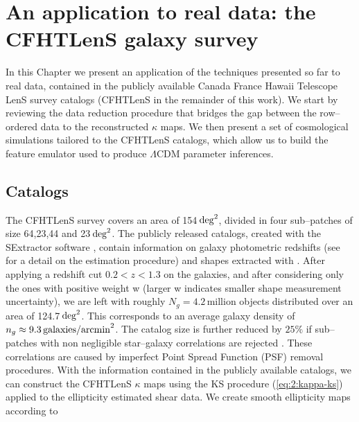 
\chapter{An application to real data: the CFHTLenS galaxy survey}
\lhead[\fancyplain{}{\thepage}]{\fancyplain{}{\rightmark}}
 \thispagestyle{plain}
\setlength{\parindent}{10mm}

\label{chp:6}

In this Chapter we present an application of the techniques presented so far to real data, contained in the publicly available Canada France Hawaii Telescope LenS survey catalogs \citep{cfht1,cfht2,CFHTKilbinger} (CFHTLenS in the remainder of this work). We start by reviewing the data reduction procedure that bridges the gap between the row--ordered data to the reconstructed $\kappa$ maps. We then present a set of cosmological simulations tailored to the CFHTLenS catalogs, which allow us to build the feature emulator used to produce $\Lambda$CDM parameter inferences.   

\section{Catalogs}
The CFHTLenS survey covers an area of 154\,${\rm deg}^2$, divided in four sub--patches of size 64,23,44 and 23\,${\rm deg}^2$. The publicly released catalogs, created with the SExtractor software \citep{SExtractor}, contain information on  galaxy photometric redshifts (see \citep{cfhtPhoto} for a detail on the estimation procedure) and shapes extracted with  \citep{cfht1,cfht2}. After applying a redshift cut $0.2<z<1.3$ on the galaxies, and after considering only the ones with positive weight w (larger w indicates smaller shape measurement uncertainty), we are left with roughly $N_g=4.2$\,million objects distributed over an area of 124.7\,${\rm deg}^2$. This corresponds to an average galaxy density of $n_g\approx 9.3\,{\rm galaxies/arcmin}^2$. The catalog size is further reduced by $25\%$ if sub--patches with non negligible star--galaxy correlations are rejected \citep{CFHTFu}. These correlations are caused by imperfect Point Spread Function (PSF) removal procedures. With the information contained in the publicly available catalogs, we can construct the CFHTLenS $\kappa$ maps using the KS procedure (\ref{eq:2:kappa-ks}) applied to the ellipticity estimated shear data. We create smooth ellipticity maps according to \citep{PetriCFHTMink,PetriCFHTPeaks}

